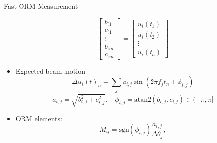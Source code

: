\documentclass[aspectratio=169]{beamer}
\begin{document}
\begin{frame}{Fast ORM Measurement}
\begin{minipage}{0.55\textwidth}
\begin{itemize}
\begin{equation*}
\begin{bmatrix}
                            b_{i}{}_{1}\\
                            c_{i}{}_{1}\\
                            \vdots \\
                            b_{i}{}_{m}\\
                            c_{i}{}_{m}
                        \end{bmatrix} =\begin{bmatrix}
                            u_{i}( t_{1})\\
                            u_{i}( t_{2})\\
                            \vdots \\
                            u_{i}( t_{n})
                        \end{bmatrix}
                \end{equation*}
            \item Expected beam motion $$\Delta u_i(t)_n = \sum_j a_{i,j}\sin(2\pi f_j t_n + \phi_{i,j})$$
                \begin{equation*}
                    a_{i,j}=\sqrt{b^2_{i,j}+c^2_{i,j}}, \quad \phi_{i,j}=\text{atan}2(b_{i,j},c_{i,j})\in(-\pi,\pi]
                \end{equation*}
            \item ORM elements:
                \begin{equation*}
                    M_{ij}=\text{sgn}(\phi_{i,j})\frac{a_{i,j}}{\Delta \theta_j},
                \end{equation*}
        \end{itemize}
    \end{minipage}
\end{frame}
\end{document}
